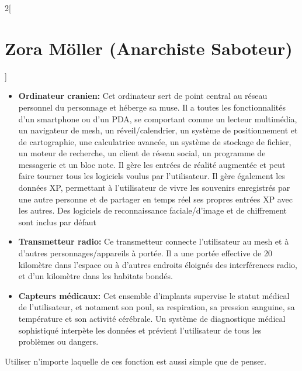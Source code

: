 \documentclass[a4paper,9pt]{article}
\begin{document}
\begin{multicols}{2}[\section*{Zora Möller (Anarchiste Saboteur)}]
   \begin{itemize}
      \item \textbf{Ordinateur cranien:} Cet ordinateur sert de point central au
         réseau personnel du personnage et héberge sa muse. Il a toutes
         les fonctionnalités d'un smartphone ou d'un PDA, se comportant comme un
         lecteur multimédia, un navigateur de mesh, un réveil/calendrier, un
         système de positionnement et de cartographie, une calculatrice avancée,
         un système de stockage de fichier, un moteur de recherche, un client de
         réseau social, un programme de messagerie et un bloc note. Il gère les
         entrées de réalité augmentée et peut faire tourner tous les logiciels
         voulus par l'utilisateur. Il gère également les données XP, permettant à
         l'utilisateur de vivre les souvenirs enregistrés par une autre personne et
         de partager en temps réel ses propres entrées XP avec les autres. Des
         logiciels de reconnaissance faciale/d'image et de chiffrement
         sont inclus par défaut
      \item \textbf{Transmetteur radio:} Ce transmetteur connecte l'utilisateur au
         mesh et à d'autres personnages/appareils à portée. Il a une portée
         effective de 20 kilomètre dans l'espace ou à d'autres endroits éloignés
         des interférences radio, et d'un kilomètre dans les habitats bondés.
      \item \textbf{Capteurs médicaux:} Cet ensemble d'implants supervise le
         statut médical de l'utilisateur, et notament son poul, sa respiration, sa
         pression sanguine, sa température et son activité cérébrale. Un système de
         diagnostique médical sophistiqué interpète les données et prévient
         l'utilisateur de tous les problèmes ou dangers.
   \end{itemize} 

   Utiliser n'importe laquelle de ces fonction est aussi simple que de penser.


\end{multicols}
\end{document}

